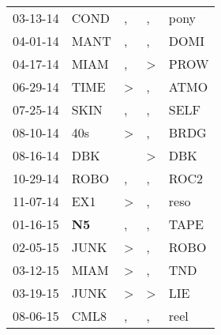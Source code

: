 \begin{supertabular}{p{0.07\textwidth}p{0.06\textwidth}p{0.02\textwidth}p{0.02\textwidth}p{0.06\textwidth}}
          03-13-14\textsuperscript{} &           COND\textsuperscript{} &                , &                , &           pony\textsuperscript{} \\
          04-01-14\textsuperscript{} &           MANT\textsuperscript{} &                , &                , &           DOMI\textsuperscript{} \\
          04-17-14\textsuperscript{} &           MIAM\textsuperscript{} &                , &     \textgreater &           PROW\textsuperscript{} \\
          06-29-14\textsuperscript{} &           TIME\textsuperscript{} &     \textgreater &                , &           ATMO\textsuperscript{} \\
          07-25-14\textsuperscript{} &           SKIN\textsuperscript{} &                , &                , &           SELF\textsuperscript{} \\
          08-10-14\textsuperscript{} &            40s\textsuperscript{} &     \textgreater &                , &           BRDG\textsuperscript{} \\
          08-16-14\textsuperscript{} &            DBK\textsuperscript{} &                  &     \textgreater &            DBK\textsuperscript{} \\
          10-29-14\textsuperscript{} &           ROBO\textsuperscript{} &                , &                , &           ROC2\textsuperscript{} \\
          11-07-14\textsuperscript{} &            EX1\textsuperscript{} &     \textgreater &                , &           reso\textsuperscript{} \\
          01-16-15\textsuperscript{} &    \textbf{N5\textsuperscript{}} &                , &                , &           TAPE\textsuperscript{} \\
          02-05-15\textsuperscript{} &           JUNK\textsuperscript{} &     \textgreater &                , &           ROBO\textsuperscript{} \\
          03-12-15\textsuperscript{} &           MIAM\textsuperscript{} &     \textgreater &                , &            TND\textsuperscript{} \\
          03-19-15\textsuperscript{} &           JUNK\textsuperscript{} &     \textgreater &     \textgreater &            LIE\textsuperscript{} \\
          08-06-15\textsuperscript{} &           CML8\textsuperscript{} &                , &                , &           reel\textsuperscript{} \\

\end{supertabular}
